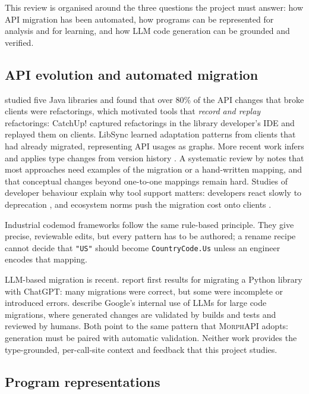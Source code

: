 \documentclass[11pt,a4paper]{article}
\newcommand{\code}[1]{\texttt{#1}}
\newcommand{\morph}{\textsc{MorphAPI}}
\begin{document}
This review is organised around the three questions the project must answer: how API
migration has been automated, how programs can be represented for analysis and for
learning, and how LLM code generation can be grounded and verified.

\subsection{API evolution and automated migration}

\citet{dig2006apis} studied five Java libraries and found that over 80\% of the API changes
that broke clients were refactorings, which motivated tools that \emph{record and replay}
refactorings: CatchUp! \citep{henkel2005catchup} captured refactorings in the library
developer's IDE and replayed them on clients. LibSync \citep{nguyen2010libsync} learned
adaptation patterns from clients that had already migrated, representing API usages as
graphs. More recent work infers and applies type changes from version history
\citep{ketkar2022typechange}. A systematic review by \citet{lamothe2021review} notes that
most approaches need examples of the migration or a hand-written mapping, and that
conceptual changes beyond one-to-one mappings remain hard. Studies of developer behaviour
explain why tool support matters: developers react slowly to deprecation
\citep{robbes2012deprecation}, and ecosystem norms push the migration cost onto
clients \citep{bogart2016break}.

Industrial codemod frameworks \citep{jscodeshift,openrewrite} follow the same rule-based
principle. They give precise, reviewable edits, but every pattern has to be authored; a
rename recipe cannot decide that \code{"US"} should become \code{CountryCode.Us} unless an
engineer encodes that mapping.

LLM-based migration is recent. \citet{almeida2024migration} report first results for
migrating a Python library with ChatGPT: many migrations were correct, but some were
incomplete or introduced errors. \citet{nikolov2025google} describe Google's internal use of
LLMs for large code migrations, where generated changes are validated by builds and tests
and reviewed by humans. Both point to the same pattern that \morph{} adopts: generation must
be paired with automatic validation. Neither work provides the type-grounded, per-call-site
context and feedback that this project studies.

\subsection{Program representations}
\end{document}
